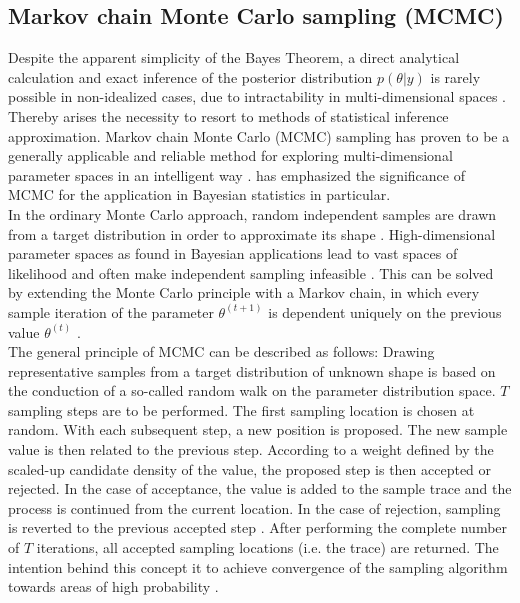         \subsection{Markov chain Monte Carlo sampling (MCMC)}\label{sec:mcmc}
        Despite the apparent simplicity of the Bayes Theorem, a direct analytical calculation and exact inference of the posterior distribution $p(\theta|y)$ is rarely possible in non-idealized cases, due to intractability in multi-dimensional spaces \citep{hoffman2014no, delaVarga2016}. Thereby arises the necessity to resort to methods of statistical inference approximation. Markov chain Monte Carlo (MCMC) sampling has proven to be a generally applicable and reliable method for exploring multi-dimensional parameter spaces in an intelligent way \citep{hoffman2014no, davidson2015}. \citet{gilks2005markov} has emphasized the significance of MCMC for the application in Bayesian statistics in particular.\\
        In the ordinary Monte Carlo approach, random independent samples are drawn from a target distribution in order to approximate its shape \citep{gilks2005markov, delaVarga2016}. High-dimensional parameter spaces as found in Bayesian applications lead to vast spaces of likelihood and often make independent sampling infeasible \citep{gilks2005markov}. This can be solved by extending the Monte Carlo principle with a Markov chain, in which every sample iteration of the parameter $\theta^{(t+1)}$ is dependent uniquely on the previous value $\theta^{(t)}$ \citep{gilks2005markov, delaVarga2016}.\\
        The general principle of MCMC can be described as follows: 
        Drawing representative samples from a target distribution of unknown shape is based on the conduction of a so-called random walk on the parameter distribution space. $T$ sampling steps are to be performed. The first sampling location is chosen at random. With each subsequent step, a new position is proposed. The new sample value is then related to the previous step. According to a weight defined by the scaled-up candidate density of the value, the proposed step is then accepted or rejected. In the case of acceptance, the value is added to the sample trace and the process is continued from the current location. In the case of rejection, sampling is reverted to the previous accepted step \citep{schaaf2017, delaVarga2016}. After performing the complete number of $T$ iterations, all accepted sampling locations (i.e. the trace) are returned. The intention behind this concept it to achieve convergence of the sampling algorithm towards areas of high probability \citep{davidson2015}.\\ 

